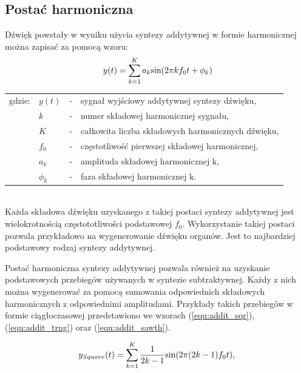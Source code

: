 \subsection{Postać harmoniczna} \label{pos_harm}
Dźwięk powstały w wyniku użycia syntezy addytywnej w formie harmonicznej można zapisać za pomocą wzoru:
\begin{equation} \label{equ:addit_time_harm}
y(t) = \sum_{k=1}^{K} a_{k}\text{sin}(2\pi kf_{0}t + \phi_{k})  \\  
\end{equation}
\begin{tabular}{ l l l l}
	gdzie: & $y(t)$ &  - & sygnał wyjściowy addytywnej syntezy dźwięku, \\
	&	$k$ & - &  numer składowej harmonicznej sygnału, \\
	&	$K$ & - &  całkowita liczba składowych harmonicznych dźwięku,\\
	&	$f_{0}$ & - &  częstotliwość pierwszej składowej harmonicznej,\\
	&	$a_{k}$ & - &  amplituda składowej harmonicznej k, \\
	&	$\phi_{k}$ & - &  faza składowej harmonicznej k. \\
\end{tabular} \\

Każda składowa dźwięku uzyskanego z takiej postaci syntezy addytywnej jest wielokrotnością częstototliwości podstawowej $f_{0}$. Wykorzystanie takiej postaci pozwala przykładowo na wygenerowanie dźwięku organów. Jest to najbardziej podstawowy rodzaj syntezy addytywnej.


Postać harmoniczna syntezy addytywnej pozwala również na uzyskanie podstawowych przebiegów używanych w syntezie subtraktywnej. Każdy z nich można wygenerować za pomocą sumowania odpowiednich składowych harmonicznych z odpowiednimi amplitudami. Przykłady takich przebiegów w formie ciągłoczasowej przedstawiono we wzorach (\ref{equ:addit_sqr}), (\ref{equ:addit_trng}) oraz (\ref{equ:addit_sawth}).

\begin{equation} \label{equ:addit_sqr}
y_{Square}(t) = \sum_{k=1}^{K} \frac{1}{2k-1} \text{sin}(2\pi (2k-1)f_{0}t), \\
\end{equation}

